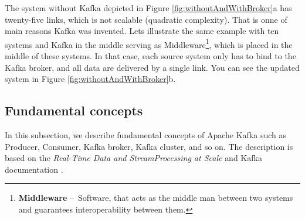 The system without Kafka depicted in Figure \ref{fig:withoutAndWithBroker}a has twenty-five links, which is not scalable (quadratic complexity).
That is onne of main reasons Kafka was invented.
Lets illustrate the same example with ten systems and Kafka in the middle serving as Middleware\footnote{\textbf{Middleware} \---\ Software, that acts as the middle man between two systems and guarantees interoperability between them.}, which is placed in the middle of these systems.
In that case, each source system only has to bind to the Kafka broker, and all data are delivered by a single link. You can see the updated system in Figure \ref{fig:withoutAndWithBroker}b.

\subsection{Fundamental concepts}

In this subsection, we describe fundamental concepts of Apache Kafka such as Producer, Consumer, Kafka broker, Kafka cluster, and so on.
The description is based on the \emph{Real-Time Data and StreamProcessing at Scale} \cite{apacheKafkaDefinitiveGuide} and Kafka documentation \cite{kafkaDocumentation}.

